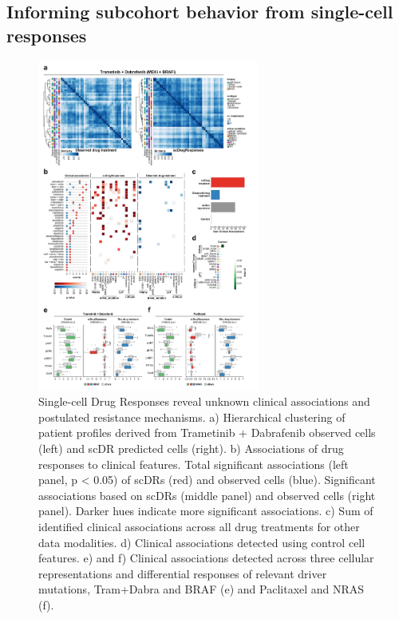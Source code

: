 \subsection{Informing subcohort behavior from single-cell responses}
\begin{figure}[htp!]
  \begin{center}
    \includegraphics[width=0.65\textwidth]{figures/cellot-cohort/iid-associations.pdf}
  \end{center}
  \caption{
  Single-cell Drug Responses reveal unknown clinical associations and postulated resistance mechanisms.
a) Hierarchical clustering of patient profiles derived from Trametinib + Dabrafenib observed cells (left) and scDR predicted cells (right).
b) Associations of drug responses to clinical features. Total significant associations (left panel, p < 0.05) of scDRs (red) and observed cells (blue). Significant associations based on scDRs (middle panel) and observed cells (right panel). Darker hues indicate more significant associations.
c) Sum of identified clinical associations across all drug treatments for other data modalities.
d) Clinical associations detected using control cell features.
e) and f) Clinical associations detected across three cellular representations and differential responses of relevant driver mutations, Tram+Dabra and BRAF (e) and Paclitaxel and NRAS (f).
}
  \label{fig:iid-associations}
\end{figure}

